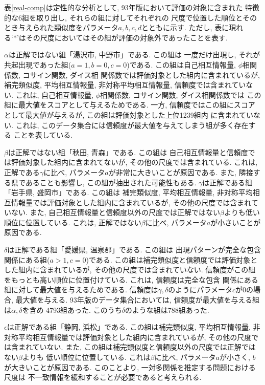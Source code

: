 表\ref{real-comp}は定性的な分析として, 93年版において評価の対象に含まれた
特徴的な6組を取り出し, それらの組に対してそれぞれの
尺度で位置した順位とそのとき与えられた類似度をパラメータ$a,b,c,d$とともに示す. 
ただし, 表に現れる`*'はその尺度においてはその組が評価の対象外であったことを表す. 

$\alpha$は正解ではない組「湯沢市, 中野市」である. この組は
一度だけ出現し, それが共起出現であった組($a=1,b=0,c=0$)である. 
この組は自己相互情報量, $\phi$相関係数, コサイン関数, ダイス相
関係数では評価対象とした組内に含まれているが, 
補完類似度, 平均相互情報量, 非対称平均相互情報量, 信頼度では含まれていない. 
これは, 自己相互情報量, $\phi$相関係数, コサイン関数, ダイス相関係数では
この組に最大値をスコアとして与えるためである. 
一方, 信頼度ではこの組にスコアとして最大値が与えるが, この組は評価対象とした上位1239組内
に含まれていない. 
これは, このデータ集合には信頼度が最大値を与えてしまう組が多く存在する
ことを表している. 

$\beta$は正解ではない組「秋田, 青森」である. この組は
自己相互情報量と信頼度では評価対象した組内に含まれてないが, その他の尺度では含まれている. 
これは, 正解である$\gamma$に比べ, パラメータ$a$が非常に大きいことが原因である. 
また, 隣接する県であることも影響し, この組が抽出された可能性もある. 
$\gamma$は正解である組「岩手県, 盛岡市」である. この組は
補完類似度, 平均相互情報量, 非対称平均相互情報量では評価対象とした組内に含まれているが, その他の尺度では含まれていない. 
また, 自己相互情報量と信頼度以外の尺度では正解ではない$\beta$よりも低い順位に位置している. 
これは, 正解ではない$\beta$に比べ, パラメータ$a$が小さいことが原因である. 

$\delta$は正解である組「愛媛県, 温泉郡」である. この組は
出現パターンが完全な包含関係にある組($a>1,c=0$)である. 
この組は補完類似度と信頼度では評価対象とした組内に含まれているが, 
その他の尺度では含まれていない. 
信頼度がこの組をもっとも高い順位に位置付けている. これは, 信頼度は完全な包含
関係にある組に対して最大値を与えるためである. 
信頼度は$\gamma,\delta$のようにパラメータ$c$が$0$の場合, 最大値を与える. 
93年版のデータ集合においては, 信頼度が最大値を与える組は$\alpha,\delta$を含め
4793組あった. このうち$\delta$のような組は788組あった. 

$\epsilon$は正解である組「静岡, 浜松」である. 
この組は補完類似度, 平均相互情報量, 非対称平均相互情報量では評価対象とした組内に含まれているが, その他の尺度では含まれていない. 
また, この組は補完類似度と信頼度以外の尺度では正解ではない$\beta$よりも
低い順位に位置している. 
これは$\beta$に比べ, パラメータ$a$が小さく, $b$が大きいことが原因である. 
このことより, 一対多関係を推定する問題における尺度は
不一致情報を緩和することが必要であると考えられる. 

